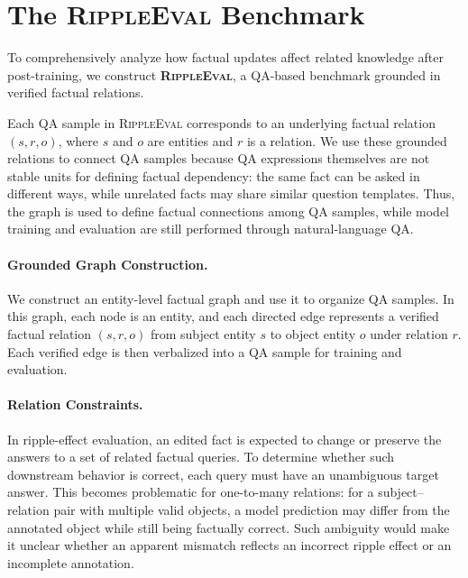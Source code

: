 

\section{The \textsc{RippleEval} Benchmark}
\label{sec:dataset}


To comprehensively analyze how factual updates affect related knowledge after post-training, we construct \textbf{\textsc{RippleEval}}, a QA-based benchmark grounded in verified factual relations. 

Each QA sample in \textsc{RippleEval} corresponds to an underlying factual relation $(s,r,o)$, where $s$ and $o$ are entities and $r$ is a relation. We use these grounded relations to connect QA samples because QA expressions themselves are not stable units for defining factual dependency: the same fact can be asked in different ways, while unrelated facts may share similar question templates. Thus, the graph is used to define factual connections among QA samples, while model training and evaluation are still performed through natural-language QA.

\paragraph{Grounded Graph Construction.}
We construct an entity-level factual graph and use it to organize QA samples. In this graph, each node is an entity, and each directed edge represents a verified factual relation $(s,r,o)$ from subject entity $s$ to object entity $o$ under relation $r$. Each verified edge is then verbalized into a QA sample for training and evaluation.
\paragraph{Relation Constraints.}
In ripple-effect evaluation, an edited fact is expected to change or preserve the answers to a set of related factual queries. To determine whether such downstream behavior is correct, each query must have an unambiguous target answer. This becomes problematic for one-to-many relations: for a subject--relation pair with multiple valid objects, a model prediction may differ from the annotated object while still being factually correct. Such ambiguity would make it unclear whether an apparent mismatch reflects an incorrect ripple effect or an incomplete annotation.

